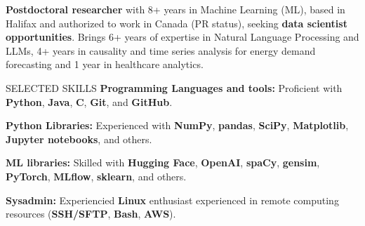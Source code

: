 \documentclass{resume}
\begin{document}
\vspace{-0.3cm}
\begin{rSection}{}
\textbf{Postdoctoral researcher} with 8+ years in Machine Learning (ML), based in Halifax and authorized to work in Canada (PR status), seeking \textbf{data scientist opportunities}. Brings 6+ years of expertise in Natural Language Processing and LLMs, 4+ years in causality and time series analysis for energy demand forecasting and 1 year in healthcare analytics.

\end{rSection}




\vspace{-0.22cm}
\begin{rSection}{SELECTED SKILLS}
\textbf{Programming Languages and tools:} Proficient with \textbf{Python}, \textbf{Java}, \textbf{C}, \textbf{Git}, and \textbf{GitHub}.
\vspace{-0.25cm}

\textbf{Python Libraries:} Experienced with \textbf{NumPy}, \textbf{pandas}, \textbf{SciPy}, \textbf{Matplotlib}, \textbf{Jupyter notebooks}, and others.
\vspace{-0.25cm}

\textbf{ML libraries:} Skilled with \textbf{Hugging Face}, \textbf{OpenAI}, \textbf{spaCy}, \textbf{gensim}, \textbf{PyTorch}, \textbf{MLflow}, \textbf{sklearn}, and others.
\vspace{-0.25cm}

\textbf{Sysadmin:} Experiencied \textbf{Linux} enthusiast experienced in remote computing resources (\textbf{SSH/SFTP}, \textbf{Bash}, \textbf{AWS}).
\end{rSection}
\end{document}
